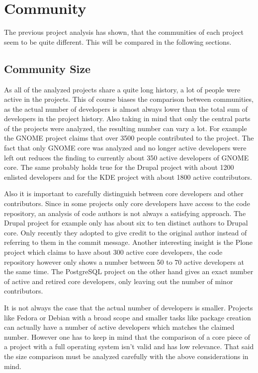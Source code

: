 
\section{Community} %

The previous project analysis has shown, that the communities of each project
seem to be quite different. This will be compared in the following sections.

\subsection{Community Size} %

As all of the analyzed projects share a quite long history, a lot of people
were active in the projects. This of course biases the comparison between
communities, as the actual number of developers is almost always lower than the
total sum of developers in the project history. Also taking in mind that only
the central parts of the projects were analyzed, the resulting number can vary
a lot. For example the GNOME project claims that over 3500 people contributed
to the project. The fact that only GNOME core was analyzed and no longer active
developers were left out reduces the finding to currently about 350 active
developers of GNOME core. The same probably holds true for the Drupal project
with about 1200 enlisted developers and for the KDE project with about
1800 active contributors.

Also it is important to carefully distinguish between core developers and other
contributors. Since in some projects only core developers have access to the
code repository, an analysis of code authors is not always a satisfying
approach. The Drupal project for example only has about six to ten distinct
authors to Drupal core. Only recently they adopted to give credit to the
original author instead of referring to them in the commit message. Another
interesting insight is the Plone project which claims to have about 300 active
core developers, the code repository however only shows a number between
50 to 70 active developers at the same time. The PostgreSQL project on the
other hand gives an exact number of active and retired core developers, only
leaving out the number of minor contributors.

It is not always the case that the actual number of developers is smaller.
Projects like Fedora or Debian with a broad scope and smaller tasks like
package creation can actually have a number of active developers which matches
the claimed number. However one has to keep in mind that the comparison of a
core piece of a project with a full operating system isn't valid and has low
relevance. That said the size comparison must be analyzed carefully with the
above considerations in mind.

